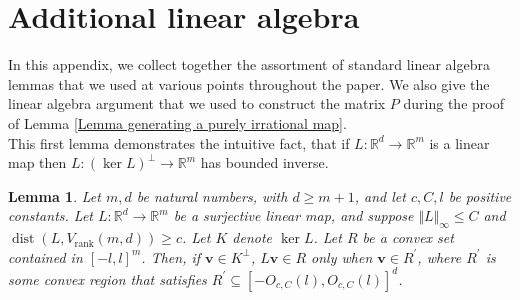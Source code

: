 \documentclass[12pt,a4paper,twoside,reqno]{amsart}
\newtheorem{Lemma}[Theorem]{Lemma}
\newcommand{\rank}{\operatorname{rank}}
\numberwithin{equation}{section}
\begin{document}
\section{Additional linear algebra}
\label{section additional linear algebra}
In this appendix, we collect together the assortment of standard linear algebra lemmas that we used at various points throughout the paper. We also give the linear algebra argument that we used to construct the matrix $P$ during the proof of Lemma \ref{Lemma generating a purely irrational map}. \\

This first lemma demonstrates the intuitive fact, that if $L:\mathbb{R}^d \longrightarrow \mathbb{R}^m$ is a linear map then $L: (\ker L)^\perp\longrightarrow \mathbb{R}^m$ has bounded inverse. 
\begin{Lemma}
\label{nonsingularity of map on orthogonal complement of Kernel}
Let $m,d$ be natural numbers, with $d\geqslant m+1$, and let $c,C,l$ be positive constants. Let $L:\mathbb{R}^d\longrightarrow \mathbb{R}^m$ be a surjective linear map, and suppose $\Vert L\Vert_\infty\leqslant C$ and $\operatorname{dist}(L,V_{\rank}(m,d))\geqslant c$. Let $K$ denote $\ker L$. Let $R$ be a convex set contained in $[-l,l]^m$. Then, if $\mathbf{v}\in K^\perp$, $L\mathbf{v}\in R$ only when $\mathbf{v}\in R^\prime$, where $R^\prime$ is some convex region that satisfies $R^\prime\subseteq [-O_{c,C}(l),O_{c,C}(l)]^d$.
\end{Lemma}
\end{document}
